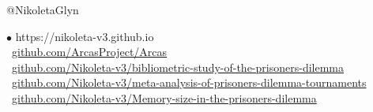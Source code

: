 \documentclass{beamer}
\begin{document}
\begin{frame}
    \begin{center}
    \faTwitter @NikoletaGlyn \\
    
    \vspace{1cm}
    \end{center}

    \footnotesize
    $\bullet$ https://nikoleta-v3.github.io \\
    \faGithub \ \url{github.com/ArcasProject/Arcas} \\
    \faGithub \ \url{github.com/Nikoleta-v3/bibliometric-study-of-the-prisoners-dilemma} \\
    \faGithub \ \url{github.com/Nikoleta-v3/meta-analysis-of-prisoners-dilemma-tournaments} \\
    \faGithub \ \url{github.com/Nikoleta-v3/Memory-size-in-the-prisoners-dilemma} \\
\end{frame}
\end{document}
